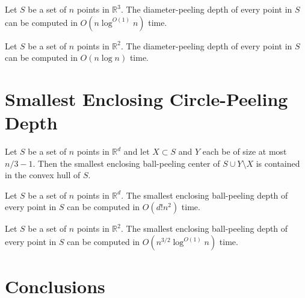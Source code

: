 \documentclass[lotsofwhite]{patmorin}
\begin{document}
\begin{thm}
Let $S$ be a set of $n$ points in $\mathbb{R}^3$.  The
diameter-peeling depth of every
point in $S$ can be computed in $O(n\log^{O(1)} n)$ time.
\end{thm}

\begin{thm}
Let $S$ be a set of $n$ points in $\mathbb{R}^2$.  The
diameter-peeling depth of every point in $S$ can be computed in
$O(n\log n)$ time.
\end{thm}


\section{Smallest Enclosing Circle-Peeling Depth}

\begin{thm}
Let $S$ be a set of $n$ points in $\mathbb{R}^d$ and let $X\subset S$ and
$Y$ each be of size at most $n/3-1$.  Then the smallest enclosing
ball-peeling center of $S\cup Y\setminus X$ is contained in the convex
hull of $S$.
\end{thm}

\begin{thm}
Let $S$ be a set of $n$ points in $\mathbb{R}^d$.  The
smallest enclosing ball-peeling depth of every point in $S$ 
can be computed in $O(d!n^2)$ time.
\end{thm}

\begin{thm}
Let $S$ be a set of $n$ points in $\mathbb{R}^2$.  The
smallest enclosing ball-peeling depth of every point in $S$ 
can be computed in $O(n^{3/2}\log^{O(1)} n)$ time.
\end{thm}



\section{Conclusions}
\end{document}
